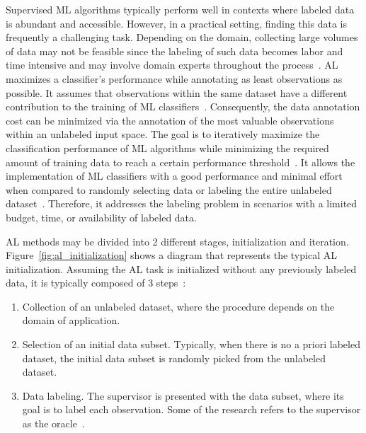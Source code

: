 \documentclass[preprint, 12pt]{elsarticle}
\begin{document}
Supervised ML algorithms typically perform well in contexts where labeled data
is abundant and accessible. However, in a practical setting, finding this data
is frequently a challenging task. Depending on the domain, collecting large
volumes of data may not be feasible since the labeling of such data becomes
labor and time intensive and may involve domain experts throughout the
process~\cite{Cao2020}. AL maximizes a classifier's performance while
annotating as least observations as possible. It assumes that observations
within the same dataset have a different contribution to the training of ML
classifiers~\cite{Ren2021}. Consequently, the data annotation cost can be
minimized via the annotation of the most valuable observations within an
unlabeled input space. The goal is to iteratively maximize the classification
performance of ML algorithms while minimizing the required amount of training
data to reach a certain performance threshold~\cite{Shrivastava2021}. It
allows the implementation of ML classifiers with a good performance and
minimal effort when compared to randomly selecting data or labeling the entire
unlabeled dataset~\cite{Ren2020}. Therefore, it addresses the labeling problem
in scenarios with a limited budget, time, or availability of labeled data. 

AL methods may be divided into 2 different stages, initialization and
iteration. Figure~\ref{fig:al_initialization} shows a diagram that represents
the typical AL initialization. Assuming the AL task is initialized without any
previously labeled data, it is typically composed of 3
steps~\cite{Fonseca2021}: 

\begin{enumerate}
    \item Collection of an unlabeled dataset, where the procedure depends on
        the domain of application.
    \item Selection of an initial data subset. Typically, when there is no a
        priori labeled dataset, the initial data subset is randomly picked
        from the unlabeled dataset.
    \item Data labeling. The supervisor is presented with the data subset,
        where its goal is to label each observation. Some of the research
        refers to the supervisor as the oracle~\cite{Yoo2019, Aghdam2019}.
\end{enumerate}
\end{document}
